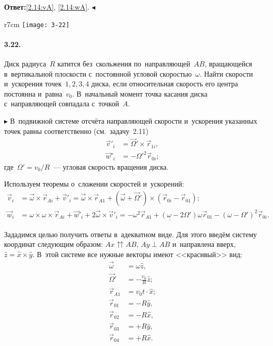 \documentclass{weekly}
\begin{document}
\textbf{Ответ:}\quad \eqref{2.14:vA}, \eqref{2.14:wA}.
\hfill $\blacktriangleleft$


\begin{wrapfigure}[6]{r}{7cm}\vspace{-5.5mm}
    \texttt{[image: 3-22]}
\end{wrapfigure}
\paragraph{3.22.} Диск радиуса~$R$ катится без~скольжения
по~направляющей~$AB$, вращающейся в~вертикальной плоскости
с~постоянной угловой скоростью~$\omega$. Найти скорости
и~ускорения точек~$1, 2, 3, 4$ диска, если относительная
скорость его центра постоянна и~равна~$v_0$.
В~начальный момент точка касания диска с~направляющей
совпадала с~точкой~$A$.

$\blacktriangleright$ В~подвижной системе отсчёта направляющей
скорости и~ускорения указанных точек
равны соответственно (см.~задачу~2.11)
\begin{align}
    \vec v'_i &= \vec\Omega' \times \vec r_{1i}, \\
    \vec w'_i &= -\Omega'^2 \vec r_{0i};
\end{align}
где~$\Omega' = v_0/R$~--- угловая скорость вращения диска.

Используем теоремы о~сложении скоростей и~ускорений:
\begin{align}
    \vec v_i &= \vec\omega \times \vec r_{Ai} + \vec v'_i
        = \vec\omega \times \vec r_{A1} +
            \left(\vec\omega + \vec\Omega'\right) \times
            \left(\vec r_{0i} - \vec r_{01}\right);
        \label{3.22:vi}
\\
    \vec w_i &= \omega \times \omega \times \vec r_{Ai} + \vec w'_i +
            2\vec\omega \times \vec v'_i
        = \underline{-\omega^2 \vec r_{A1} +
            \left(\omega - 2\Omega'\right)\omega \vec r_{01}} -
            \left(\omega - \Omega'\right)^2 \vec r_{0i}.
        \label{3.22:wi}
\end{align}

Зададимся целью получить ответы в~адекватном виде.
Для этого введём систему координат следующим образом:
$Ax \upuparrows AB$, $Ay \perp AB$ и~направлена вверх,
$\hat z = \hat x \times \hat y$.
В~этой системе все нужные векторы имеют <<красивый>> вид:
\begin{align}
    \vec\omega &= \omega \hat z, \\
    \vec\Omega' &= -\frac{v_0}{R} \hat z; \\[1.5ex]
    \vec r_{A1} &= v_0 t \cdot \hat x;\\
    \vec r_{01} &= -R \hat y, \\
    \vec r_{02} &= -R \hat x, \\
    \vec r_{03} &= +R \hat y, \\
    \vec r_{04} &= +R \hat x.
\end{align}
\end{document}
